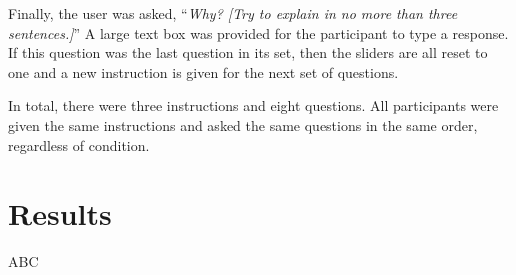 Finally, the user was asked, ``\textit{Why? [Try to explain in no more than three sentences.]}''  A large text box was provided for the participant to type a response.  If this question was the last question in its set, then the sliders are all reset to one and a new instruction is given for the next set of questions. 

In total, there were three instructions and eight questions.  All participants were given the same instructions and asked the same questions in the same order, regardless of condition.

\section{Results}

ABC
